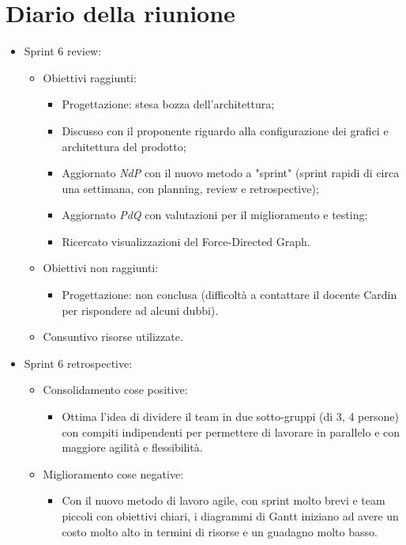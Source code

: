 \section{Diario della riunione}
\begin{itemize}
  \item Sprint 6 review:
        \begin{itemize}
          \item Obiettivi raggiunti:
                \begin{itemize}
                  \item Progettazione: stesa bozza dell'architettura;
                  \item Discusso con il proponente riguardo alla configurazione dei grafici e architettura del prodotto;
                  \item Aggiornato \textit{NdP} con il nuovo metodo a "sprint" (sprint rapidi di circa una settimana, con planning, review e retrospective);
                  \item Aggiornato \textit{PdQ} con valutazioni per il miglioramento e testing;
                  \item Ricercato visualizzazioni del Force-Directed Graph.
                \end{itemize}
          \item Obiettivi non raggiunti:
                \begin{itemize}
                  \item Progettazione: non conclusa (difficoltà a contattare il docente Cardin per rispondere ad alcuni dubbi).
                \end{itemize}
          \item Consuntivo risorse utilizzate.
        \end{itemize}
\end{itemize}


\begin{itemize}
  \item Sprint 6 retrospective:
        \begin{itemize}
          \item Consolidamento cose positive:
                \begin{itemize}
                  \item Ottima l'idea di dividere il team in due sotto-gruppi (di 3, 4 persone) con compiti indipendenti per permettere di lavorare in parallelo e con maggiore agilità e flessibilità.
                \end{itemize}
          \item Miglioramento cose negative:
                \begin{itemize}
                  \item Con il nuovo metodo di lavoro agile, con sprint molto brevi e team piccoli con obiettivi chiari, i diagrammi di Gantt iniziano ad avere un costo molto alto in termini di risorse e un guadagno molto basso.
                \end{itemize}
        \end{itemize}
\end{itemize}


